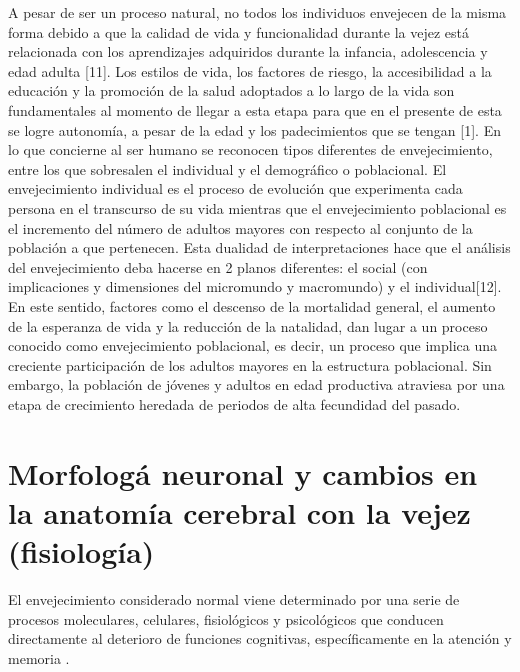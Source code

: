A pesar de ser un proceso natural, no todos los individuos envejecen de la misma forma debido a que la calidad de vida y funcionalidad durante la vejez está relacionada con los aprendizajes adquiridos durante la infancia, adolescencia y edad adulta [11]. Los estilos de vida, los factores de riesgo, la accesibilidad a la educación y la promoción de la salud adoptados a lo largo de la vida son fundamentales al momento de llegar a esta etapa para que en el presente de esta se logre autonomía, a pesar de la edad y los padecimientos que se tengan [1].
	En lo que concierne al ser humano se reconocen tipos diferentes de envejecimiento, entre los que sobresalen el individual y el demográfico o poblacional. El envejecimiento individual es el proceso de evolución que experimenta cada persona en el transcurso de su vida mientras que el envejecimiento poblacional es el incremento del número de adultos mayores con respecto al conjunto de la población a que pertenecen. Esta dualidad de interpretaciones hace que el análisis del envejecimiento deba hacerse en 2 planos diferentes: el social (con implicaciones y dimensiones del micromundo y macromundo) y el individual[12].
	En este sentido, factores como el descenso de la mortalidad general, el aumento de la esperanza de vida y la reducción de la natalidad, dan lugar a un proceso conocido como envejecimiento poblacional, es decir, un proceso que implica una creciente participación de los adultos mayores en la estructura poblacional. Sin embargo, la población de jóvenes y adultos en edad productiva atraviesa por una etapa de crecimiento heredada de periodos de alta fecundidad del pasado.


\section{Morfolog\'a neuronal y cambios en la anatomía cerebral con la vejez (fisiolog\'ia)}

El envejecimiento considerado normal viene determinado por una serie de procesos moleculares, 
celulares, fisiol\'ogicos y psicol\'ogicos que conducen directamente al deterioro de funciones 
cognitivas, específicamente en la atenci\'on y memoria \cite{Navarrete03,Park09}.

